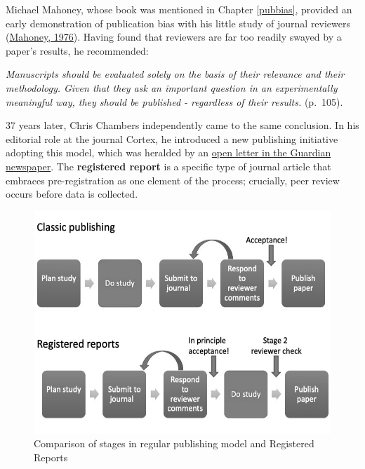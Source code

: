 \documentclass{krantz}
\begin{document}
Michael Mahoney, whose book was mentioned in Chapter \ref{pubbias}, provided an early demonstration of publication bias with his little study of journal reviewers (\protect\hyperlink{ref-mahoney1976}{Mahoney, 1976}). Having found that reviewers are far too readily swayed by a paper's results, he recommended:

\emph{Manuscripts should be evaluated solely on the basis of their relevance and their methodology. Given that they ask an important question in an experimentally meaningful way, they should be published - regardless of their results.} (p.~105).

37 years later, Chris Chambers independently came to the same conclusion. In his editorial role at the journal Cortex, he introduced a new publishing initiative adopting this model, which was heralded by an \href{https://www.theguardian.com/science/blog/2013/jun/05/trust-in-science-study-pre-registration}{open letter in the Guardian newspaper}. The \textbf{registered report} is a specific type of journal article that embraces pre-registration as one element of the process; crucially, peer review occurs before data is collected.

\begin{figure}

{\centering \includegraphics[width=0.75\linewidth]{images_bw/RR_compare_regularpublishing} 

}

\caption{Comparison of stages in regular publishing model and Registered Reports}\label{fig:RRcompare}
\end{figure}
\end{document}
